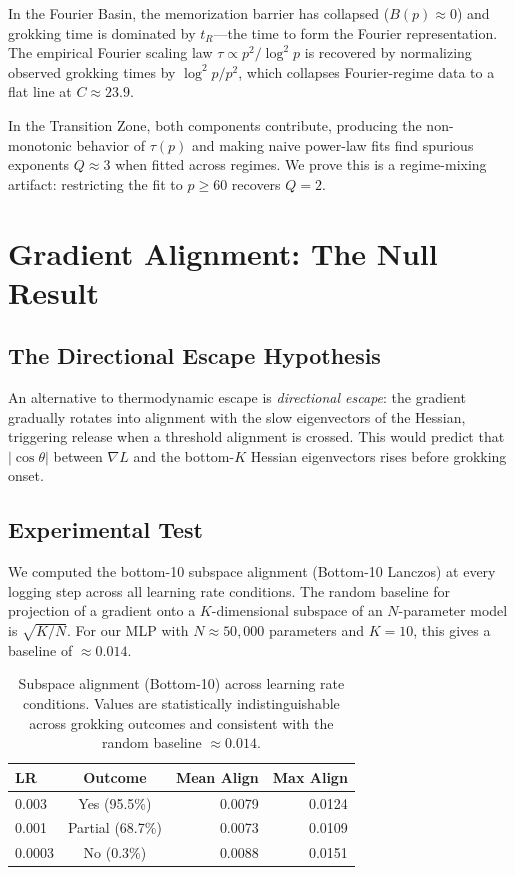 \documentclass[11pt,twocolumn]{article}
\begin{document}
In the Fourier Basin, the memorization barrier has collapsed ($B(p) \approx 0$) and grokking time is dominated by $t_R$---the time to form the Fourier representation. The empirical Fourier scaling law $\tau \propto p^2/\log^2 p$ is recovered by normalizing observed grokking times by $\log^2 p / p^2$, which collapses Fourier-regime data to a flat line at $C \approx 23.9$.

In the Transition Zone, both components contribute, producing the non-monotonic behavior of $\tau(p)$ and making naive power-law fits find spurious exponents $Q \approx 3$ when fitted across regimes. We prove this is a regime-mixing artifact: restricting the fit to $p \geq 60$ recovers $Q = 2$.

\section{Gradient Alignment: The Null Result}
\label{sec:alignment}

\subsection{The Directional Escape Hypothesis}

An alternative to thermodynamic escape is \emph{directional escape}: the gradient gradually rotates into alignment with the slow eigenvectors of the Hessian, triggering release when a threshold alignment is crossed. This would predict that $|\cos\theta|$ between $\nabla L$ and the bottom-$K$ Hessian eigenvectors rises before grokking onset.

\subsection{Experimental Test}

We computed the bottom-10 subspace alignment (Bottom-10 Lanczos) at every logging step across all learning rate conditions. The random baseline for projection of a gradient onto a $K$-dimensional subspace of an $N$-parameter model is $\sqrt{K/N}$. For our MLP with $N \approx 50{,}000$ parameters and $K=10$, this gives a baseline of $\approx 0.014$.

\begin{table}[H]
\centering
\small
\begin{tabularx}{\columnwidth}{@{}l c r r@{}}
\toprule
LR & Outcome & Mean Align & Max Align \\
\midrule
0.003  & Yes (95.5\%) & 0.0079 & 0.0124 \\
0.001  & Partial (68.7\%) & 0.0073 & 0.0109 \\
0.0003 & No (0.3\%)   & 0.0088 & 0.0151 \\
\bottomrule
\end{tabularx}
\caption{Subspace alignment (Bottom-10) across learning rate conditions. Values are statistically indistinguishable across grokking outcomes and consistent with the random baseline $\approx 0.014$.}
\label{tab:alignment}
\end{table}
\end{document}
